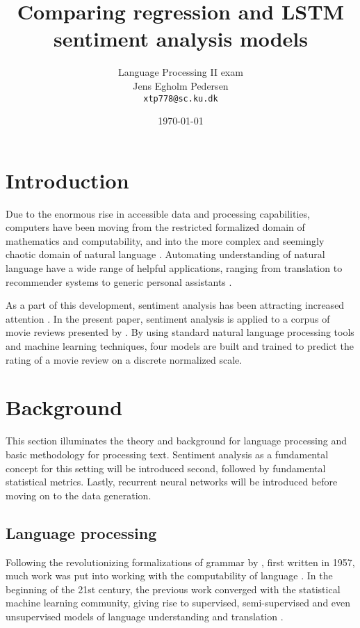 \documentclass[a4paper]{article}
\title{Comparing regression and LSTM sentiment analysis models}
\author{Language Processing II exam \\ Jens Egholm Pedersen \\ \texttt{xtp778@sc.ku.dk}}
\date{\today}
\begin{document}
\maketitle

\tableofcontents

\pagebreak

\section{Introduction}
\label{sec:introduction}
Due to the enormous rise in accessible data and processing capabilities,
computers have been moving from the restricted formalized domain of
mathematics and computability, and into the more complex and seemingly
chaotic domain of natural language \citep{NILSSON2009, Jurafsky2000}. Automating
understanding of natural language have a wide range of helpful applications,
ranging from translation to recommender systems to generic personal assistants
\citep{COX2005, BKL2009}.

As a part of this development, sentiment analysis has been attracting increased
attention \citep{BKL2009, Jurafsky2000}. In the present paper, sentiment
analysis is applied to a corpus of movie reviews presented by \cite{PangLee2005}.
By using standard natural
language processing tools and machine learning techniques, four models are built
and trained to predict the rating of a movie review on a discrete normalized scale.

\section{Background}
This section illuminates the theory and background for language processing
and basic methodology for processing text.
Sentiment analysis as a fundamental concept for this setting will be introduced
second, followed by fundamental statistical metrics. Lastly,
recurrent neural networks will be introduced before moving on to the data
generation.

\subsection{Language processing}
Following the revolutionizing formalizations of grammar by \cite{Chomsky2002},
first written in 1957, much work was put into working with the computability
of language \citep{Jurafsky2000}. In the beginning of the 21st century,
the previous work converged with the statistical machine learning community,
giving rise to supervised, semi-supervised and even unsupervised models
of language understanding and translation \citep{Jurafsky2000}.
\end{document}
